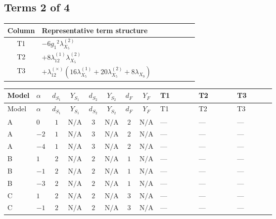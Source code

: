 \documentclass[8pt]{article}
\begin{document}
\begin{landscape}
\subsection*{Terms 2 of 4}
\begin{center}
\begin{tabular}{@{}c >{\raggedright\arraybackslash}p{0.82\linewidth}@{}}
\toprule
Column & Representative term structure \\
\midrule
T1 & \(\displaystyle -6 {g_1}^2 {\lambda_{X_{5}}^{(2)}}\) \\
\midrule
T2 & \(\displaystyle +8 {\lambda_{12}^{(1)}} {\lambda_{X_{5}}^{(2)}}\) \\
\midrule
T3 & \(\displaystyle +{\lambda_{12}^{(\times)}} (16 {\lambda_{X_{5}}^{(1)}}+20 {\lambda_{X_{5}}^{(2)}}+8 {\lambda_{X_{9}}})\) \\
\midrule
\bottomrule
\end{tabular}
\end{center}
\smallskip
\tiny
\begin{longtable}{@{}llcccccc >{\raggedright\arraybackslash}p{0.21\linewidth} >{\raggedright\arraybackslash}p{0.21\linewidth} >{\raggedright\arraybackslash}p{0.21\linewidth}@{}}
\toprule
Model & $\alpha$ & $d_{S_1}$ & $Y_{S_1}$ & $d_{S_2}$ & $Y_{S_2}$ & $d_F$ & $Y_F$ & T1 & T2 & T3 \\
\midrule
\endfirsthead
\toprule
Model & $\alpha$ & $d_{S_1}$ & $Y_{S_1}$ & $d_{S_2}$ & $Y_{S_2}$ & $d_F$ & $Y_F$ & T1 & T2 & T3 \\
\midrule
\endhead
A & $0$ & $1$ & $\text{N/A}$ & $3$ & $\text{N/A}$ & $2$ & $\text{N/A}$ & --- & --- & --- \\
\midrule
A & $-2$ & $1$ & $\text{N/A}$ & $3$ & $\text{N/A}$ & $2$ & $\text{N/A}$ & --- & --- & --- \\
\midrule
A & $-4$ & $1$ & $\text{N/A}$ & $3$ & $\text{N/A}$ & $2$ & $\text{N/A}$ & --- & --- & --- \\
\midrule
B & $1$ & $2$ & $\text{N/A}$ & $2$ & $\text{N/A}$ & $1$ & $\text{N/A}$ & --- & --- & --- \\
\midrule
B & $-1$ & $2$ & $\text{N/A}$ & $2$ & $\text{N/A}$ & $1$ & $\text{N/A}$ & --- & --- & --- \\
\midrule
B & $-3$ & $2$ & $\text{N/A}$ & $2$ & $\text{N/A}$ & $1$ & $\text{N/A}$ & --- & --- & --- \\
\midrule
C & $1$ & $2$ & $\text{N/A}$ & $2$ & $\text{N/A}$ & $3$ & $\text{N/A}$ & --- & --- & --- \\
\midrule
C & $-1$ & $2$ & $\text{N/A}$ & $2$ & $\text{N/A}$ & $3$ & $\text{N/A}$ & --- & --- & --- \\

\end{longtable}
\end{landscape}
\end{document}
